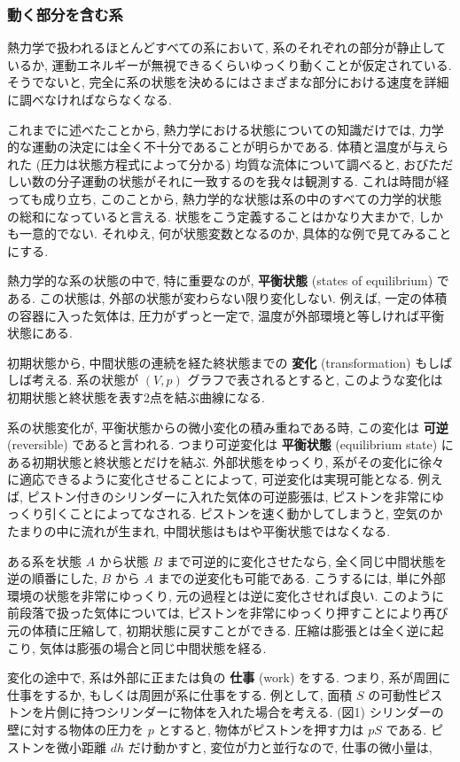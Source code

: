 \subsubsection*{動く部分を含む系}
熱力学で扱われるほとんどすべての系において, 系のそれぞれの部分が静止しているか, 運動エネルギーが無視できるくらいゆっくり動くことが仮定されている. そうでないと, 完全に系の状態を決めるにはさまざまな部分における速度を詳細に調べなければならなくなる. \par
これまでに述べたことから, 熱力学における状態についての知識だけでは, 力学的な運動の決定には全く不十分であることが明らかである. 体積と温度が与えられた (圧力は状態方程式によって分かる) 均質な流体について調べると, おびただしい数の分子運動の状態がそれに一致するのを我々は観測する. これは時間が経っても成り立ち, このことから, 熱力学的な状態は系の中のすべての力学的状態の総和になっていると言える. 状態をこう定義することはかなり大まかで, しかも一意的でない. それゆえ, 何が状態変数となるのか, 具体的な例で見てみることにする. \par
熱力学的な系の状態の中で, 特に重要なのが, \textbf{平衡状態} (states of equilibrium) である. この状態は, 外部の状態が変わらない限り変化しない. 例えば, 一定の体積の容器に入った気体は, 圧力がずっと一定で, 温度が外部環境と等しければ平衡状態にある. \par
初期状態から, 中間状態の連続を経た終状態までの \textbf{変化} (transformation) もしばしば考える. 系の状態が $(V,p)$ グラフで表されるとすると, このような変化は初期状態と終状態を表す2点を結ぶ曲線になる.\par
系の状態変化が, 平衡状態からの微小変化の積み重ねである時, この変化は \textbf{可逆} (reversible) であると言われる. つまり可逆変化は \textbf{平衡状態} (equilibrium state) にある初期状態と終状態とだけを結ぶ. 外部状態をゆっくり, 系がその変化に徐々に適応できるように変化させることによって, 可逆変化は実現可能となる. 例えば, ピストン付きのシリンダーに入れた気体の可逆膨張は, ピストンを非常にゆっくり引くことによってなされる. ピストンを速く動かしてしまうと, 空気のかたまりの中に流れが生まれ, 中間状態はもはや平衡状態ではなくなる.\par
ある系を状態 $A$ から状態 $B$ まで可逆的に変化させたなら, 全く同じ中間状態を逆の順番にした, $B$ から $A$ までの逆変化も可能である. こうするには, 単に外部環境の状態を非常にゆっくり, 元の過程とは逆に変化させれば良い. このように前段落で扱った気体については, ピストンを非常にゆっくり押すことにより再び元の体積に圧縮して, 初期状態に戻すことができる. 圧縮は膨張とは全く逆に起こり, 気体は膨張の場合と同じ中間状態を経る. \par
変化の途中で, 系は外部に正または負の \textbf{仕事} (work) をする. つまり, 系が周囲に仕事をするか, もしくは周囲が系に仕事をする. 例として, 面積 $S$ の可動性ピストンを片側に持つシリンダーに物体を入れた場合を考える. (図1) シリンダーの壁に対する物体の圧力を $p$ とすると, 物体がピストンを押す力は $pS$ である. ピストンを微小距離 $dh$ だけ動かすと, 変位が力と並行なので, 仕事の微小量は, 


